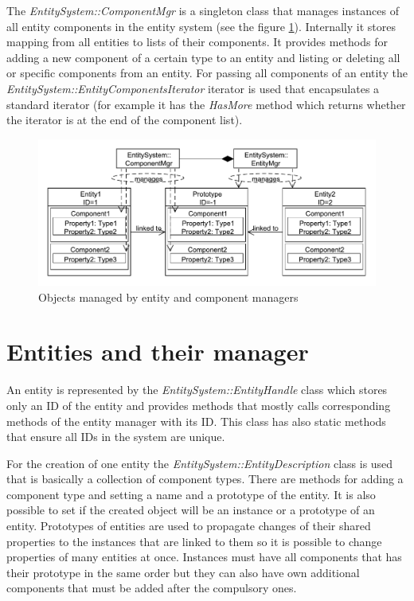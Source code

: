 \documentclass[a4paper, 12pt]{report}
\begin{document}
The \emph{EntitySystem::ComponentMgr} is a singleton class that manages instances of all entity components in the entity system (see the figure \ref{fig:entity-component-managers-diagram}). Internally it stores mapping from all entities to lists of their components. It provides methods for adding a new component of a certain type to an entity and listing or deleting all or specific components from an entity. For passing all components of an entity the \emph{EntitySystem::EntityComponentsIterator} iterator is used that encapsulates a standard iterator (for example it has the \emph{HasMore} method which returns whether the iterator is at the end of the component list).

\begin{figure}[htbp]
	\centering
		\includegraphics[width=1\textwidth]{EntityAndComponentManagers.pdf}
	\caption{Objects managed by entity and component managers}
	\label{fig:entity-component-managers-diagram}
\end{figure}

\section{Entities and their manager}

An entity is represented by the \emph{EntitySystem::EntityHandle} class which sto\-res only an ID of the entity and provides methods that mostly calls corresponding methods of the entity manager with its ID. This class has also static methods that ensure all IDs in the system are unique.

For the creation of one entity the \emph{EntitySystem::EntityDescription} class is used that is basically a collection of component types. There are methods for adding a component type and setting a name and a prototype of the entity. It is also possible to set if the created object will be an instance or a prototype of an entity. Prototypes of entities are used to propagate changes of their shared properties to the instances that are linked to them so it is possible to change properties of many entities at once. Instances must have all components that has their prototype in the same order but they can also have own additional components that must be added after the compulsory ones.
\end{document}
